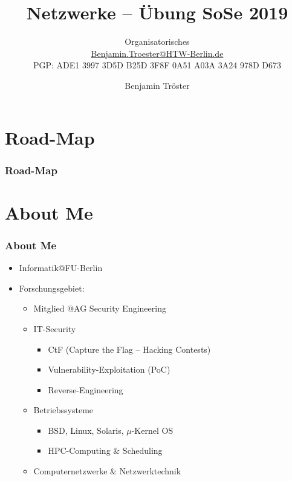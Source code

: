 \documentclass[xcolor=dvipsnames,aspectratio=169]{beamer}
\begin{document}

\title{Netzwerke -- Übung SoSe 2019}
\subtitle{Organisatorisches\\

\href{mailto:Benjamin.Troester@HTW-Berlin.de}{Benjamin.Troester@HTW-Berlin.de}\\
		PGP: ADE1 3997 3D5D B25D 3F8F 0A51 A03A 3A24 978D D673 }

\author{Benjamin Tröster}

\date{}

\begin{frame}
\titlepage
\end{frame}

\section*{Road-Map}
\begin{frame}
\frametitle{Road-Map}
\begin{multicols}{2}
  \tableofcontents
\end{multicols}
\end{frame}

\section*{About Me}
\begin{frame}
\frametitle{About Me}
\begin{itemize}
	\item Informatik@FU-Berlin
	\item Forschungsgebiet:
	\begin{itemize}
		\item Mitglied @AG Security Engineering
		\item IT-Security
		\begin{itemize}
			\item CtF (Capture the Flag -- Hacking Contests)
			\item Vulnerability-Exploitation (PoC)
			\item Reverse-Engineering
		\end{itemize}
		\item Betriebssysteme
		\begin{itemize}
			\item BSD, Linux, Solaris, $\mu$-Kernel OS
			\item HPC-Computing \& Scheduling
		\end{itemize}
		\item Computernetzwerke \& Netzwerktechnik
	\end{itemize}
\end{itemize} 
\end{frame}
\end{document}
